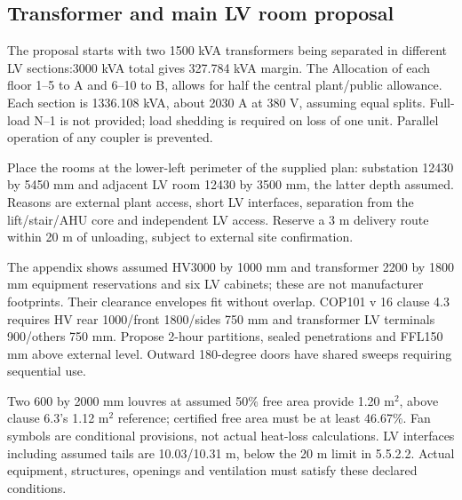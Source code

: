 \subsection*{Transformer and main LV room proposal}
The proposal starts with two 1500 kVA transformers being separated in different LV sections:3000 kVA total gives 327.784 kVA margin. The Allocation of each floor 1--5 to A and 6--10 to B, allows for half the central plant/public allowance. Each section is 1336.108 kVA, about 2030 A at 380 V, assuming equal splits. Full-load N--1 is not provided;  load shedding is required on loss of one unit. Parallel operation of any coupler is prevented.

Place the rooms at the lower-left perimeter of the supplied plan: substation 12430 by 5450 mm and adjacent LV room 12430 by 3500 mm, the latter depth assumed. Reasons are external plant access, short LV interfaces, separation from the lift/stair/AHU core and independent LV access. Reserve a 3 m delivery route within 20 m of unloading, subject to external site confirmation.

The appendix shows assumed HV3000 by 1000 mm and transformer 2200 by 1800 mm equipment reservations and six LV cabinets;  these are not manufacturer footprints. Their clearance envelopes fit without overlap. COP101 v 16 clause 4.3 requires HV rear 1000/front 1800/sides 750 mm and transformer LV terminals 900/others 750 mm. Propose 2-hour partitions, sealed penetrations and FFL150 mm above external level. Outward 180-degree doors have shared sweeps requiring sequential use.

Two 600 by 2000 mm louvres at assumed 50\% free area provide 1.20 m$^2$, above clause 6.3's 1.12 m$^2$ reference;  certified free area must be at least 46.67\%. Fan symbols are conditional provisions, not actual heat-loss calculations. LV interfaces including assumed tails are 10.03/10.31 m, below the 20 m limit in 5.5.2.2. Actual equipment, structures, openings and ventilation must satisfy these declared conditions.
